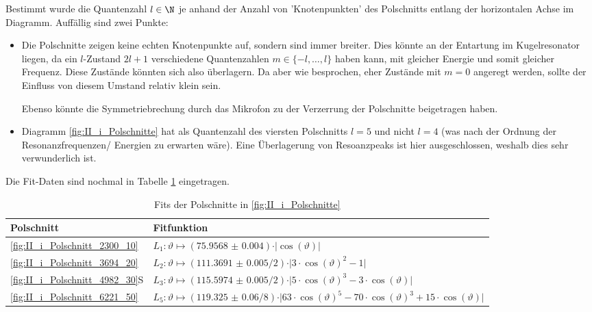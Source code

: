 \documentclass[../main.tex]{subfiles}
\begin{document}
    Bestimmt wurde die Quantenzahl $l\in\N$ je anhand der Anzahl von 'Knotenpunkten' des Polschnitts entlang der horizontalen Achse im Diagramm. Auffällig sind zwei Punkte:
    \begin{itemize}
        \item Die Polschnitte zeigen keine echten Knotenpunkte auf, sondern sind immer breiter. Dies könnte an der Entartung im Kugelresonator liegen, da ein $l$-Zustand $2l+1$ verschiedene Quantenzahlen $m\in\{-l,\hdots,l\}$ haben kann, mit gleicher Energie und somit gleicher Frequenz. Diese Zustände könnten sich also überlagern. Da aber wie besprochen, eher Zustände mit $m=0$ angeregt werden, sollte der Einfluss von diesem Umstand relativ klein sein.
        
        Ebenso könnte die Symmetriebrechung durch das Mikrofon zu der Verzerrung der Polschnitte beigetragen haben.

        \item Diagramm \ref{fig:II_i_Polschnitte} hat als Quantenzahl des viersten Polschnitts $l=5$ und nicht $l=4$ (was nach der Ordnung der Resonanzfrequenzen/ Energien zu erwarten wäre). Eine Überlagerung von Resoanzpeaks ist hier ausgeschlossen, weshalb dies sehr verwunderlich ist.
    \end{itemize}

    Die Fit-Daten sind nochmal in Tabelle \ref{tab:II_i_Polschnitte} eingetragen.

    \begin{table}[H]
        \centering 
        \begin{tabular}{l|l}
            \textbf{Polschnitt} & \textbf{Fitfunktion}\\
            \hline\hline
            \ref{fig:II_i_Polschnitt_2300_10} & $L_1: \vartheta\mapsto (\num{75.9568(40)})\cdot\vert\cos(\vartheta)\vert$\\
            \ref{fig:II_i_Polschnitt_3694_20} & $L_2: \vartheta\mapsto (\num{111.3691(50)}/2)\cdot\vert 3\cdot\cos(\vartheta)^2 - 1\vert$\\
            \ref{fig:II_i_Polschnitt_4982_30}S & $L_3: \vartheta\mapsto (\num{115.5974(50)}/2)\cdot\vert 5\cdot\cos(\vartheta)^3 - 3\cdot\cos(\vartheta)\vert$\\
            \ref{fig:II_i_Polschnitt_6221_50} & $L_5: \vartheta\mapsto (\num{119.325(60)}/8)\cdot\vert 63\cdot\cos(\vartheta)^5 - 70\cdot\cos(\vartheta)^3 + 15\cdot\cos(\vartheta)\vert$
        \end{tabular}
        \caption{Fits der Polschnitte in \ref{fig:II_i_Polschnitte}}
        \label{tab:II_i_Polschnitte}
    \end{table}
\end{document}
